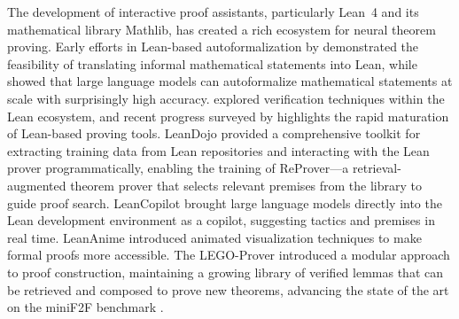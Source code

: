 \documentclass[11pt,a4paper]{article}
\begin{document}
The development of interactive proof assistants, particularly Lean~4 and its mathematical library Mathlib, has created a rich ecosystem for neural theorem proving. Early efforts in Lean-based autoformalization by \citet{jiang2022lean} demonstrated the feasibility of translating informal mathematical statements into Lean, while \citet{wu2022autoformalization} showed that large language models can autoformalize mathematical statements at scale with surprisingly high accuracy. \citet{zheng2021lean} explored verification techniques within the Lean ecosystem, and recent progress surveyed by \citet{wu2024lean} highlights the rapid maturation of Lean-based proving tools. LeanDojo \citep{yang2024leandojo} provided a comprehensive toolkit for extracting training data from Lean repositories and interacting with the Lean prover programmatically, enabling the training of ReProver---a retrieval-augmented theorem prover that selects relevant premises from the library to guide proof search. LeanCopilot \citep{song2024leancopilot} brought large language models directly into the Lean development environment as a copilot, suggesting tactics and premises in real time. LeanAnime \citep{yang2023leananime} introduced animated visualization techniques to make formal proofs more accessible. The LEGO-Prover \citep{wang2024legoprover} introduced a modular approach to proof construction, maintaining a growing library of verified lemmas that can be retrieved and composed to prove new theorems, advancing the state of the art on the miniF2F benchmark \citep{zheng2022minif2f}.
\end{document}

